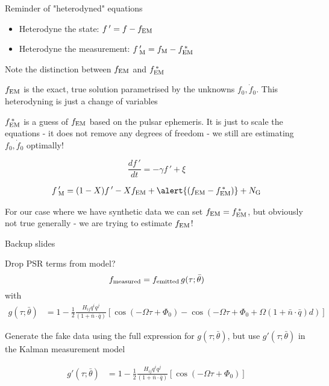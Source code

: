 \documentclass[10pt]{beamer}
\begin{document}
	\begin{frame}{}
	
	Reminder of "heterodyned" equations
	
	\begin{itemize}
		\item Heterodyne the state: $f \, ' = f - f_{\rm EM}$ 
		\item Heterodyne the measurement: $f \, '_{\rm M}  = f_{\rm M} - f^{\, *}_{\rm EM}$ 
	\end{itemize}
	
	Note the distinction between $ f_{\rm EM}$ and $f^{\, *}_{\rm EM}$
	
	$f_{\rm EM}$ is the exact, true solution parametrised by the unknowns $f_0, \dot{f}_0$. This heterodyning is just a change of variables
	
	$f^{\, *}_{\rm EM}$ is a guess of $f_{\rm EM}$ based on the pulsar ephemeris. It is just to scale the equations - it does not remove any degrees of freedom - we still are estimating $f_0, \dot{f}_0$ optimally!
		
	\begin{equation}
		\frac{df \, '}{dt} = - \gamma f \, '  + \xi 
	\end{equation}

	\begin{eqnarray}
		f \, '_{\rm M} = (1 - X)f \, ' - X f_{\rm EM} + \alert{(f_{\rm EM} - f^{\, *}_{\rm EM})} +  N_{\rm G}
	\end{eqnarray}

	For our case where we have synthetic data we can set $f_{\rm EM} = f^{\, *}_{\rm EM}$, but obviously not true generally - we are trying to estimate $f_{\rm EM}$!
	

	
	
\end{frame}



\begin{frame}[standout]
	Backup slides
\end{frame}

\appendix



\begin{frame}{Drop PSR terms from model?}
	\begin{equation}
		f_{\rm measured} = f_{\rm emitted} \, g(\tau; \bar{\theta})
		\label{eq:measureent}
	\end{equation}
	with
	\begin{align}
		g(\tau; \bar{\theta}) 
		& = 1 - \frac{1}{2} \frac{ H_{ij}q^i q^j }{(1 + \bar{n}\cdot \bar{q}) } \left[ \cos(-\Omega \tau +\Phi_0) - \cos(-\Omega \tau +\Phi_0 + \Omega (1 + \bar{n}\cdot \bar{q})  d) \right]
	\end{align}
	
	Generate the fake data using the full expression for $g(\tau; \bar{\theta})$, but use $g'(\tau; \bar{\theta})$ in the Kalman measurement model
	
	\begin{align}
		g'(\tau; \bar{\theta}) 
		& = 1 - \frac{1}{2} \frac{ H_{ij}q^i q^j }{(1 + \bar{n}\cdot \bar{q}) } \left[ \cos(-\Omega \tau +\Phi_0) \right]
	\end{align}
\end{frame}
\end{document}
